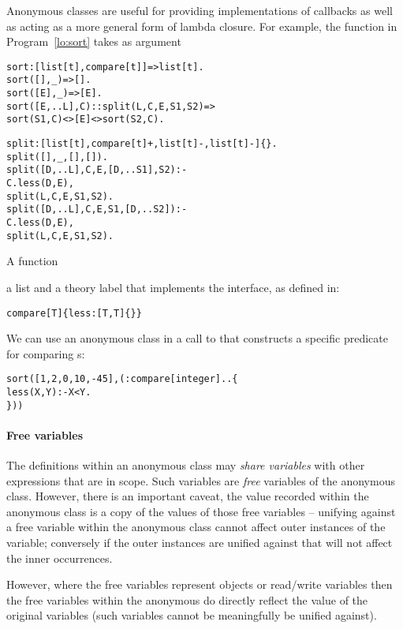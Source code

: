 Anonymous classes are useful for providing implementations of callbacks as well as acting as a more general form of lambda closure. For example, the  function in Program~\vref{lo:sort} takes as argument
\begin{program}
\begin{boxed}
\begin{alltt}
sort:[list[t],compare[t]]=>list[t].
sort([],\_) => [].
sort([E],\_) => [E].
sort([E,..L],C)::split(L,C,E,S1,S2) => 
    sort(S1,C)<>[E]<>sort(S2,C).

split:[list[t],compare[t]+,list[t]-,list[t]-]\{\}.
split([],\_,[],[]).
split([D,..L],C,E,[D,..S1],S2) :-
  C.less(D,E),
  split(L,C,E,S1,S2).
split([D,..L],C,E,S1,[D,..S2]) :-
  \nasf C.less(D,E),
  split(L,C,E,S1,S2).
\end{alltt}
\end{boxed}
\caption{A  function\label{lo:sort}}
\end{program}
a list and a theory label that implements the  interface, as defined in:
\begin{alltt}
compare[T] \impl \{ less:[T,T]\{\} \}
\end{alltt}
We can use an anonymous class in a call to  that constructs a specific predicate for comparing s:
\begin{alltt}
sort([1,2,0,10,-45],(:compare[integer]..\{
  less(X,Y) :- X<Y.
\}))
\end{alltt}

\paragraph{Free variables}
The definitions within an anonymous class may \emph{share variables} with other expressions that are in scope. Such variables are \emph{free} variables of the anonymous class. However, there is an important caveat, the value recorded within the anonymous class is a copy of the values of those free variables -- unifying against a free variable within the anonymous class cannot affect outer instances of the variable; conversely if the outer instances are unified against that will not affect the inner occurrences.

However, where the free variables represent objects or read/write variables then the free variables within the anonymous do directly reflect the value of the original variables (such variables cannot be meaningfully be unified against).

